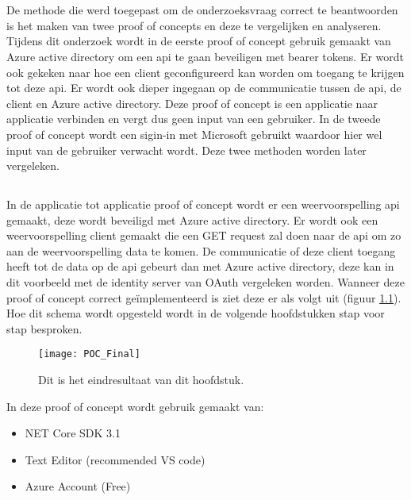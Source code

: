 
\chapter{}
\label{ch:methodologie}


De methode die werd toegepast om de onderzoeksvraag correct te beantwoorden is het maken van twee proof of concepts en deze te vergelijken en analyseren. Tijdens dit onderzoek wordt in de eerste proof of concept gebruik gemaakt van Azure active directory om een api te gaan beveiligen met bearer tokens. Er wordt ook gekeken naar hoe een client geconfigureerd kan worden om toegang te krijgen tot deze api. Er wordt ook dieper ingegaan op de communicatie tussen de api, de client en Azure active directory. Deze proof of concept is een applicatie naar applicatie verbinden en vergt dus geen input van een gebruiker. In de tweede proof of concept wordt een sigin-in met Microsoft gebruikt waardoor hier wel input van de gebruiker verwacht wordt. Deze twee methoden worden later vergeleken.

\section{}
\label{sec:Client_Credentials_Grant}
In de applicatie tot applicatie proof of concept wordt er een weervoorspelling api gemaakt, deze wordt beveiligd met Azure active directory. Er wordt ook een weervoorspelling client gemaakt die een GET request zal doen naar de api om zo aan de weervoorspelling data te komen. De communicatie of deze client toegang heeft tot de data op de api gebeurt dan met Azure active directory, deze kan in dit voorbeeld met de identity server van OAuth vergeleken worden. Wanneer deze proof of concept correct geïmplementeerd is ziet deze er als volgt uit (figuur \ref{fig:pocfinal}). Hoe dit schema wordt opgesteld wordt in de volgende hoofdstukken stap voor stap besproken.
\begin{figure}[H]
	\centering
	\texttt{[image: POC\_Final]} 
	\caption[Dit is het eindresultaat van dit hoofdstuk]{Dit is het eindresultaat van dit hoofdstuk.}
	\label{fig:pocfinal}
\end{figure}
In deze proof of concept wordt gebruik gemaakt van:	
\begin{itemize}
	\item NET Core SDK 3.1
	\item Text Editor (recommended VS code)
	\item Azure Account (Free)
\end{itemize}
